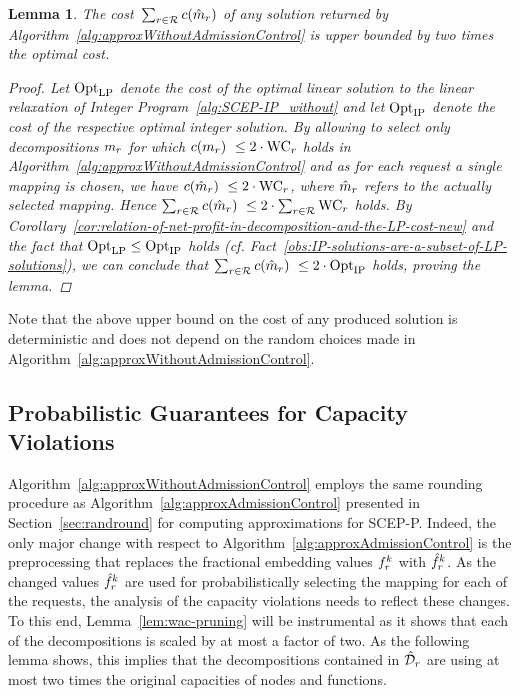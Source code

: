 \documentclass[10pt, conference, letterpaper]{IEEEtran}
\newtheorem{lemma}[theorem]{Lemma}
\begin{document}
\begin{lemma}
\label{lem:deterministic-objective-guarantee-without}
The cost~$\sum_{r \in \mathcal{R}} c(\hat{m}_{r})$ of any solution returned by Algorithm~\ref{alg:approxWithoutAdmissionControl} is upper bounded by two times the optimal cost.
\begin{proof}
Let $\textnormal{Opt}_{\textnormal{LP}}$ denote the cost of the optimal linear solution to the linear relaxation of Integer Program~\ref{alg:SCEP-IP_without} and let $\textnormal{Opt}_{\textnormal{IP}}$ denote the cost of the respective optimal integer solution. By allowing to select only decompositions $m_{r}$ for which $c(\map)~\leq 2\cdot \WAC$ holds in  Algorithm~\ref{alg:approxWithoutAdmissionControl} and as for each request a single mapping is chosen, we have $c(\hat{m}_{\req})~\leq 2\cdot \WAC$, where $\hat{m}_{r}$ refers to the actually selected mapping. Hence $\sum_{\req \in \requests} c(\hat{m}_{\req})~\leq 2\cdot \sum_{\req \in \requests} \WAC$ holds. By Corollary~\ref{cor:relation-of-net-profit-in-decomposition-and-the-LP-cost-new} and the fact that $\textnormal{Opt}_{\textnormal{LP}} \leq \textnormal{Opt}_{\textnormal{IP}}$ holds (cf. Fact~\ref{obs:IP-solutions-are-a-subset-of-LP-solutions}), we can conclude that $\sum_{r \in \mathcal{R}} c(\hat{m}_{r})~\leq 2 \cdot \textnormal{Opt}_{\textnormal{IP}}$ holds, proving the lemma.
\end{proof}
\end{lemma}

Note that the above upper bound on the cost of any produced solution is deterministic and does not depend on the random choices made in Algorithm~\ref{alg:approxWithoutAdmissionControl}.

\subsection{Probabilistic Guarantees for Capacity Violations}

Algorithm~\ref{alg:approxWithoutAdmissionControl} employs the same rounding procedure as Algorithm~\ref{alg:approxAdmissionControl} presented in Section~\ref{sec:randround} for computing approximations for SCEP-P. Indeed, the only major change with respect to Algorithm~\ref{alg:approxAdmissionControl} is the preprocessing that replaces the fractional embedding values $\prob$ with $\probHat$. As the changed values $\probHat$ are used for probabilistically selecting the mapping for each of the requests, the analysis of the capacity violations needs to reflect these changes. To this end, Lemma~\ref{lem:wac-pruning} will be instrumental as it shows that each of the decompositions is scaled by at most a factor of two. As the following lemma shows, this implies that the decompositions contained in $\PotEmbeddingsHat$ are using at most two times the original capacities of nodes and functions.
\end{document}
